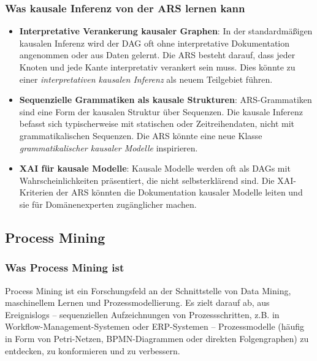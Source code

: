 \documentclass[12pt,a4paper]{article}
\begin{document}
\subsubsection{Was kausale Inferenz von der ARS lernen kann}

\begin{itemize}
    \item \textbf{Interpretative Verankerung kausaler Graphen}: In der 
    standardmäßigen kausalen Inferenz wird der DAG oft ohne interpretative 
    Dokumentation angenommen oder aus Daten gelernt. Die ARS besteht darauf, 
    dass jeder Knoten und jede Kante interpretativ verankert sein muss. Dies 
    könnte zu einer \textit{interpretativen kausalen Inferenz} als neuem 
    Teilgebiet führen.
    
    \item \textbf{Sequenzielle Grammatiken als kausale Strukturen}: ARS-Grammatiken 
    sind eine Form der kausalen Struktur über Sequenzen. Die kausale Inferenz 
    befasst sich typischerweise mit statischen oder Zeitreihendaten, nicht mit 
    grammatikalischen Sequenzen. Die ARS könnte eine neue Klasse \textit{grammatikalischer 
    kausaler Modelle} inspirieren.
    
    \item \textbf{XAI für kausale Modelle}: Kausale Modelle werden oft als 
    DAGs mit Wahrscheinlichkeiten präsentiert, die nicht selbsterklärend sind. 
    Die XAI-Kriterien der ARS könnten die Dokumentation kausaler Modelle 
    leiten und sie für Domänenexperten zugänglicher machen.
\end{itemize}

\subsection{Process Mining}

\subsubsection{Was Process Mining ist}

Process Mining ist ein Forschungsfeld an der Schnittstelle von Data Mining, 
maschinellem Lernen und Prozessmodellierung. Es zielt darauf ab, aus 
Ereignislogs – sequenziellen Aufzeichnungen von Prozessschritten, z.B. in 
Workflow-Management-Systemen oder ERP-Systemen – Prozessmodelle (häufig in 
Form von Petri-Netzen, BPMN-Diagrammen oder direkten Folgengraphen) zu 
entdecken, zu konformieren und zu verbessern.
\end{document}

